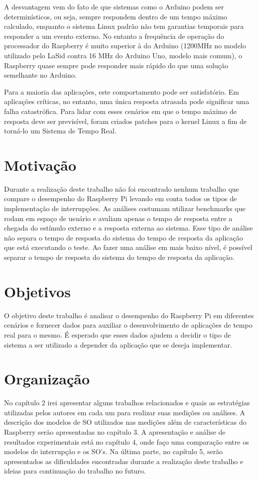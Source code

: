 A desvantagem vem do fato de que sistemas como o Arduino podem ser determinísticos, ou seja, sempre respondem dentro de um tempo máximo calculado, enquanto o sistema Linux padrão não tem garantias temporais para responder a um evento externo. No entanto a frequência de operação do processador do Raspberry é muito superior à do Arduino (1200MHz no modelo utilizado pelo LaSid contra 16 MHz do Arduino Uno, modelo mais comum), o Raspberry quase sempre pode responder mais rápido do que uma solução semelhante no Arduino.

Para a maioria das aplicações, este comportamento pode ser satisfatório. Em aplicações críticas, no entanto, uma única resposta atrasada pode significar uma falha catastrófica. Para lidar com esses cenários em que o tempo máximo de resposta deve ser previsível, foram criados patches para o kernel Linux a fim de torná-lo um Sistema de Tempo Real. 

\section{Motivação}

Durante a realização deste trabalho não foi encontrado nenhum trabalho que compare o desempenho do Raspberry Pi levando em conta todos os tipos de implementação de interrupções. As análises costumam utilizar benchmarks que rodam em espaço de usuário e avaliam apenas o tempo de resposta entre a chegada do estímulo externo e a resposta externa ao sistema. Esse tipo de análise não separa o tempo de resposta do sistema do tempo de resposta da aplicação que está executando o teste. Ao fazer uma análise em mais baixo nível, é possível separar o tempo de resposta do sistema do tempo de resposta da aplicação.

\section{Objetivos}

O objetivo deste trabalho é analisar o desempenho do Raspberry Pi em diferentes cenários e fornecer dados para auxiliar o desenvolvimento de aplicações de tempo real para o mesmo. É esperado que esses dados ajudem a decidir o tipo de sistema a ser utilizado a depender da aplicação que se deseja implementar.

\section{Organização}

No capítulo 2 irei apresentar alguns trabalhos relacionados e quais as estratégias utilizadas pelos autores em cada um para realizar suas medições ou análises. A descrição dos modelos de SO utilizados nas medições além de características do Raspberry serão apresentadas no capítulo 3. A apresentação e análise de resultados experimentais está no capítulo 4, onde faço uma comparação entre os modelos de interrupção e os SO's. Na última parte, no capítulo 5, serão apresentados as dificuldades encontradas durante a realização deste trabalho e ideias para continuação do trabalho no futuro.